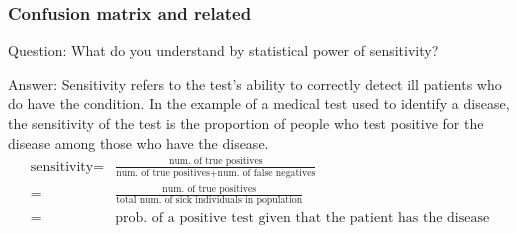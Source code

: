 \documentclass[11pt]{beamer}
\begin{document}
\begin{frame}
\frametitle{Confusion matrix and related}
\begin{block}{Question:}
	What do you understand by statistical power of sensitivity?
\end{block}
\begin{block}{Answer:}
	Sensitivity refers to the test's ability to correctly detect ill patients who do have the condition. In the example of a medical test used to identify a disease, the sensitivity of the test is the proportion of people who test positive for the disease among those who have the disease.
	\begin{align*}
		\text{sensitivity}=&\frac{\text{num. of true positives}}{\text{num. of true positives} +\text{num. of false negatives}}\\
		=&\frac{\text{num. of true positives}}{\text{total num. of sick individuals in population}}\\
		=& \text{prob. of a positive test given that the patient has the disease}
	\end{align*}

\end{block}
\end{frame}
\end{document}
